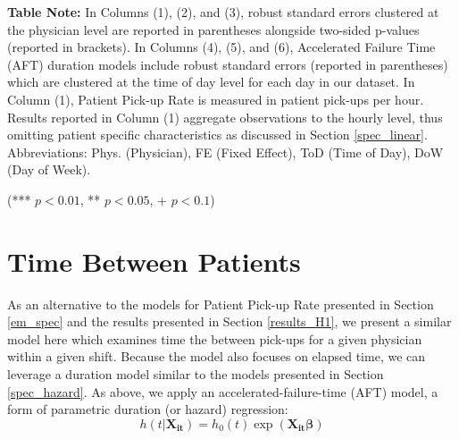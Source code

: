 \begin{table}[htbp]
{\begin{threeparttable}[t]
\begin{tablenotes}
      \item \textbf{Table Note:} In Columns (1), (2), and (3), robust standard errors clustered at the physician level are reported in parentheses alongside two-sided p-values (reported in brackets). In Columns (4), (5), and (6), Accelerated Failure Time (AFT) duration models include robust standard errors (reported in parentheses) which are clustered at the time of day level for each day in our dataset. In Column (1), Patient Pick-up Rate is measured in patient pick-ups per hour. Results reported in Column (1) aggregate observations to the hourly level, thus omitting patient specific characteristics as discussed in Section \ref{spec_linear}. Abbreviations: Phys. (Physician), FE (Fixed Effect), ToD (Time of Day), DoW (Day of Week). %
      \item (*** $p < 0.01$, ** $p < 0.05$, + $p < 0.1$)
    \end{tablenotes}
  \end{threeparttable} }
 \end{table}

\section{Time Between Patients} \label{app_pu_hazard_between}
 As an alternative to the models for Patient Pick-up Rate presented in Section \ref{em_spec} and the results presented in Section \ref{results_H1}, we present a similar model here which examines time the between pick-ups for a given physician within a given shift. Because the model also focuses on elapsed time, we can leverage a duration model similar to the models presented in Section \ref{spec_hazard}. As above, we apply an accelerated-failure-time (AFT) model, a form of parametric duration (or hazard) regression:
  \begin{equation}
  h(t|\boldsymbol{X_{it}}) = h_0(t) \exp(\boldsymbol{X_{it}} \boldsymbol{\beta})
  \end{equation}
 
